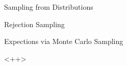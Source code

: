 \documentclass{article}
\begin{document}
\begin{ssection}{Sampling from Distributions}
\begin{ssubsection}{Rejection Sampling}
	\end{ssubsection}

\end{ssection}

\begin{ssection}{Expections via Monte Carlo Sampling}

	
	
\end{ssection}<++>
\end{document}
